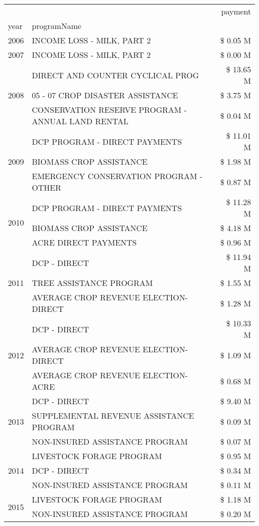 \begin{tabular}{llr}
\toprule
 &  & payment \\
year & programName &  \\
\midrule
2006 & INCOME LOSS - MILK, PART 2 & \$ 0.05 M \\
\cline{1-3}
2007 & INCOME LOSS - MILK, PART 2 & \$ 0.00 M \\
\cline{1-3}
\multirow[t]{3}{*}{2008} & DIRECT AND COUNTER CYCLICAL PROG & \$ 13.65 M \\
 & 05 - 07 CROP DISASTER ASSISTANCE & \$ 3.75 M \\
 & CONSERVATION RESERVE PROGRAM - ANNUAL LAND RENTAL & \$ 0.04 M \\
\cline{1-3}
\multirow[t]{3}{*}{2009} & DCP PROGRAM - DIRECT PAYMENTS & \$ 11.01 M \\
 & BIOMASS CROP ASSISTANCE & \$ 1.98 M \\
 & EMERGENCY CONSERVATION PROGRAM - OTHER & \$ 0.87 M \\
\cline{1-3}
\multirow[t]{3}{*}{2010} & DCP PROGRAM - DIRECT PAYMENTS & \$ 11.28 M \\
 & BIOMASS CROP ASSISTANCE & \$ 4.18 M \\
 & ACRE DIRECT PAYMENTS & \$ 0.96 M \\
\cline{1-3}
\multirow[t]{3}{*}{2011} & DCP - DIRECT & \$ 11.94 M \\
 & TREE ASSISTANCE PROGRAM & \$ 1.55 M \\
 & AVERAGE CROP REVENUE ELECTION-DIRECT & \$ 1.28 M \\
\cline{1-3}
\multirow[t]{3}{*}{2012} & DCP - DIRECT & \$ 10.33 M \\
 & AVERAGE CROP REVENUE ELECTION-DIRECT & \$ 1.09 M \\
 & AVERAGE CROP REVENUE ELECTION-ACRE & \$ 0.68 M \\
\cline{1-3}
\multirow[t]{3}{*}{2013} & DCP - DIRECT & \$ 9.40 M \\
 & SUPPLEMENTAL REVENUE ASSISTANCE PROGRAM & \$ 0.09 M \\
 & NON-INSURED ASSISTANCE PROGRAM & \$ 0.07 M \\
\cline{1-3}
\multirow[t]{3}{*}{2014} & LIVESTOCK FORAGE PROGRAM & \$ 0.95 M \\
 & DCP - DIRECT & \$ 0.34 M \\
 & NON-INSURED ASSISTANCE PROGRAM & \$ 0.11 M \\
\cline{1-3}
\multirow[t]{3}{*}{2015} & LIVESTOCK FORAGE PROGRAM & \$ 1.18 M \\
 & NON-INSURED ASSISTANCE PROGRAM & \$ 0.20 M \\

\end{tabular}
